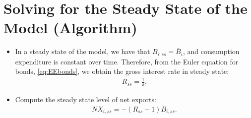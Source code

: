 \documentclass{article}
\begin{document}
\newpage
\section{Solving for the Steady State of the Model (Algorithm)}
\label{sec:SteadyState}

\begin{itemize}
    \item In a steady state of the model, we have that $B_{i,ss}=\bar{B}_{i}$, and consumption expenditure is constant over time. Therefore, from the Euler equation for bonds, \eqref{eq:EEbonds}, we obtain the gross interest rate in steady state:
    \begin{align}
        R_{ss} = \frac{1}{\delta}.
    \end{align}

    \item Compute the steady state level of net exports:
    \begin{align}
        NX_{i,ss} = - (R_{ss} - 1) B_{i,ss}.
    \end{align}


\end{itemize}
\end{document}
